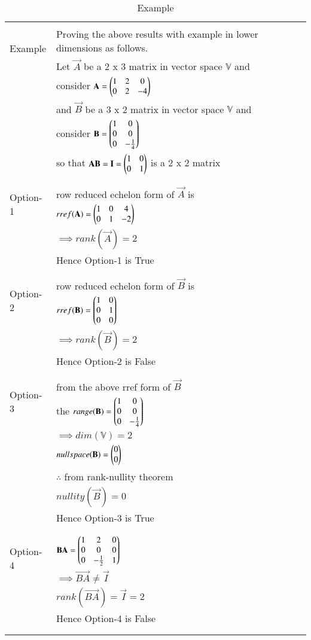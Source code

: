 \begin{longtable}{|l|l|}
\hline
\multirow{3}{*}{Example} & \\
& Proving the above results with example in lower dimensions as follows.\\
& Let $\vec{A}$ be a 2 x 3 matrix in vector space $\mathbb{V}$ and\\
& consider $\mathbf{A} = \begin{pmatrix}1&2&0\\0&2&-4\end{pmatrix}$\\
& and $\vec{B}$ be a 3 x 2 matrix in vector space $\mathbb{V}$ and\\
& consider $\mathbf{B} = \begin{pmatrix}1&0\\0&0\\0&-\frac{1}{4}\end{pmatrix}$\\
& so that $\mathbf{AB} = \mathbf{I} = \begin{pmatrix}1&0\\0&1\end{pmatrix}$ is a 2 x 2 matrix\\
& \\
\hline
\multirow{3}{*}{Option-1} & \\
& row reduced echelon form of $\vec{A}$ is\\
& $rref(\mathbf{A}) = \begin{pmatrix}1&0&4\\0&1&-2\end{pmatrix}$\\
& $\implies rank(\vec{A}) = 2$\\
& Hence Option-1 is True\\
&\\
\hline
\multirow{3}{*}{Option-2} & \\
& row reduced echelon form of $\vec{B}$ is\\
& $rref(\mathbf{B}) = \begin{pmatrix}1&0\\0&1\\0&0\end{pmatrix}$\\
& $\implies rank(\vec{B}) = 2$\\
& Hence Option-2 is False\\
&\\
\hline
\multirow{3}{*}{Option-3} & \\
& from the above rref form of $\vec{B}$\\
& the $range(\mathbf{B}) = \begin{pmatrix}1&0\\0&0\\0&-\frac{1}{4}\end{pmatrix}$\\
& $\implies dim(\mathbb{V}) = 2$\\
& $nullspace(\mathbf{B}) = \begin{pmatrix}0\\0\end{pmatrix}$\\
& $\therefore$ from rank-nullity theorem\\
& $nullity(\vec{B}) = 0$\\
& Hence Option-3 is True\\
&\\
\hline
\multirow{3}{*}{Option-4} & \\
& $\mathbf{BA} = \begin{pmatrix}1&2&0\\0&0&0\\0&-\frac{1}{2}&1\end{pmatrix}$\\
& $\implies \vec{BA} \neq \vec{I}$\\
& $rank(\vec{BA}) = \vec{I} = 2$\\
& Hence Option-4 is False\\
&\\
\hline
\caption{Example}
\label{eq:solutions/2014/dec/78/table:2}
\end{longtable}
\twocolumn
